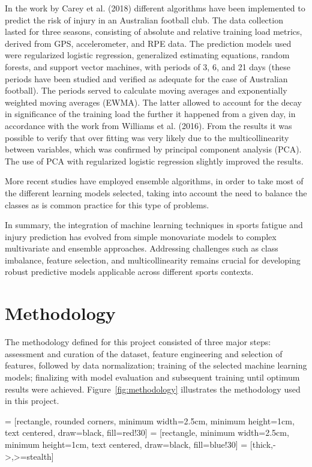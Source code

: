 \documentclass[conference]{IEEEtran}
\begin{document}
In the work by Carey et al. (2018) different algorithms have been implemented to predict the risk of injury in an Australian football club. The data collection lasted for three seasons, consisting of absolute and relative training load metrics, derived from GPS, accelerometer, and RPE data. The prediction models used were regularized logistic regression, generalized estimating equations, random forests, and support vector machines, with periods of 3, 6, and 21 days (these periods have been studied and verified as adequate for the case of Australian football). The periods served to calculate moving averages and exponentially weighted moving averages (EWMA). The latter allowed to account for the decay in significance of the training load the further it happened from a given day, in accordance with the work from Williams et al. (2016). From the results it was possible to verify that over fitting was very likely due to the multicollinearity between variables, which was confirmed by principal component analysis (PCA). The use of PCA with regularized logistic regression slightly improved the results.

More recent studies have employed ensemble algorithms, in order to take most of the different learning models selected, taking into account the need to balance the classes as is common practice for this type of problems. 

In summary, the integration of machine learning techniques in sports fatigue and injury prediction has evolved from simple monovariate models to complex multivariate and ensemble approaches. Addressing challenges such as class imbalance, feature selection, and multicollinearity remains crucial for developing robust predictive models applicable across different sports contexts.

\section{Methodology}
The methodology defined for this project consisted of three major steps: assessment and curation of the dataset, feature engineering and selection of features, followed by data normalization; training of the selected machine learning models; finalizing with model evaluation and subsequent training until optimum results were achieved. Figure~\ref{fig:methodology} illustrates the methodology used in this project.

 = [rectangle, rounded corners, minimum width=2.5cm, minimum height=1cm, text centered, draw=black, fill=red!30]
 = [rectangle, minimum width=2.5cm, minimum height=1cm, text centered, draw=black, fill=blue!30]
 = [thick,->,>=stealth]
\end{document}
